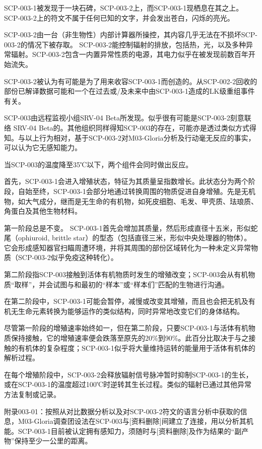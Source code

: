 SCP-003-1被发现于一块石碑，SCP-003-2上，而SCP-003-1现栖息在其之上。SCP-003-2上的符文不属于任何已知的文字，并会发出苍白，闪烁的亮光。

SCP-003-2由一台（非生物性）内部计算器所操控，其内容几乎无法在不损坏SCP-003-2的情况下被存取。 SCP-003-2能控制辐射的排放，包括热，光，以及多种异常辐射。SCP-003-2包含一内置异常性质的电源，其电力似乎在被发现前数百年开始流失。

SCP-003-2被认为有可能是为了用来收容SCP-003-1而创造的。从SCP-002-2回收的部份已解译数据可能和一个在过去或/及未来中由SCP-003-1造成的LK级重组事件有关。

SCP-003由远程监视小组SRV-04 Beta所发现。似乎很有可能是SCP-003-2刻意联络 SRV-04 Beta的。其他组织同样得知SCP-003的存在，可能亦是透过类似方式得知。与以上行为相对，基于SCP-003-2对M03-Gloria分析及行动毫无反应的事实，可以认为它无感知能力。

当SCP-003的温度降至35℃以下，两个组件会同时做出反应。

首先，SCP-003-1会进入增殖状态，特征为其质量呈指数增长。此状态分为两个阶段，自始至终，SCP-003-1会部分地通过转换周围的物质促进自身增殖。先是无机物，如大气成分，继而是无生命的有机物，如死皮细胞、毛发、甲壳质、珐琅质、角蛋白及其他生物材料。

第一阶段总是不变。 SCP-003-1首先会增加其质量，然后形成直径十五米，形似蛇尾（ophiuroid, brittle star）的型态（包括直径三米，形似中央处理器的物体）。它会形成感知器官扫瞄周遭环境，并将其周围的部份区域转化为一种未定义异常物质（SCP-003-2似乎免疫这种转化）。

第二阶段指SCP-003接触到活体有机物质时发生的增殖改变；SCP-003会从有机物质“取样”，并会试图与和最初的“样本”或“样本们”匹配的生物进行沟通。

在第二阶段中，SCP-003-1可能会暂停，减慢或改变其增殖，而且也会把无机及有机无生命元素转换为能够运作的类似结构，同时异常地改变它们的身体结构。

尽管第一阶段的增殖速率始终如一，但在第二阶段，只要SCP-003-1与活体有机物质保持接触，它的增殖速率便会跌落至原先的20\%到90\%。此百分比取决于与之接触的有机体的复杂程度；SCP-003-1似乎将大量维持运转的能量用于活体有机体的解析过程。

在每个增殖阶段中，SCP-003-2会释放辐射信号脉冲暂时抑制SCP-003-1的生长，或在SCP-003-1的温度超过100℃时逆转其生长过程。类似的辐射已通过其他异常方法复制或记录。

附录003-01：按照从对比数据分析以及对SCP-003-2符文的语言分析中获取的信息，M03-Gloria调查团设法在SCP-003与[资料删除]间建立了连接，用以分析其机能。SCP-003-1目前被认定拥有感知力，须随时与[资料删除]及作为结果的“副产物”保持至少一公里的距离。

